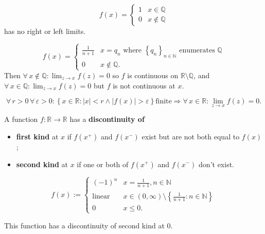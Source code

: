 \documentclass{notes}
\begin{document}
  \begin{eg}
    \[
      f(x) = \begin{cases}
        1 & x \in \mathbb Q \\ 
        0 & x \not \in \mathbb Q
      \end{cases}
    \]
    has no right or left limits.
  \end{eg}
  
  \begin{eg}
    \[
      f(x) = \begin{cases}
        \frac{1}{n + 1} & x = q_n \text{ where $\left \{ q_n \right \}_{n \in \mathbb N}$ enumerates $\mathbb Q$} \\ 
        0 & x \not \in \mathbb Q.
      \end{cases}
    \]
    Then $\forall \, x \not \in \mathbb Q: \lim_{z \to x} f(z) = 0$ so $f$ is continuous on $\mathbb R \setminus \mathbb Q$, and $\forall \, x \in \mathbb Q: \lim_{z \to x} f(z) = 0$ but $f$ is not continuous at $x$.
  \end{eg}
  
  \begin{lem}
    \[
      \forall \, r > 0 \, \forall \, \varepsilon > 0: \left \{ x \in \mathbb R : \left | x \right | < r \land \left | f(x) \right | > \varepsilon \right \} \text{finite} \Rightarrow \forall \, x \in \mathbb R: \lim_{z \to x} f(z) = 0.
    \]
  \end{lem}
  
  \begin{defn}
    A function $f \colon \mathbb R \to \mathbb R$ has a {\boldmath \bfseries discontinuity of }
    \begin{itemize}
      \item {\boldmath \bfseries first kind} at $x$ if $f(x^+)$ and $f(x^-)$ exist but are not both equal to $f(x)$;

      \item {\boldmath \bfseries second kind} at $x$ if one or both of $f(x^+)$ and $f(x^-)$ don't exist.
    \end{itemize}
  \end{defn}
  
  \newpage
  
  \begin{eg}
    \[
      f(x) := \begin{cases}
        (-1)^n & x = \frac{1}{n + 1}, n \in \mathbb N \\ 
        \text{linear} & x \in (0, \infty) \setminus \left \{ \frac{1}{n + 1} : n \in \mathbb N \right \} \\ 
        0 & x \leq 0.
      \end{cases}
    \]
    
    
    This function has a discontinuity of second kind at 0.
  \end{eg}
\end{document}
